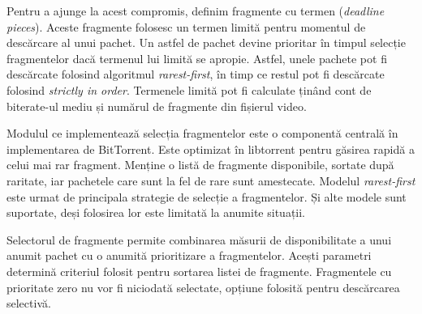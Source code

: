 Pentru a ajunge la acest compromis, definim fragmente cu termen
(\textit{deadline pieces}). Aceste fragmente folosesc un termen limită pentru
momentul de descărcare al unui pachet. Un astfel de pachet devine prioritar în
timpul selecție fragmentelor dacă termenul lui limită se apropie. Astfel,
unele pachete pot fi descărcate folosind algoritmul \textit{rarest-first},
în timp ce restul pot fi descărcate folosind \textit{strictly in order}.
Termenele limită pot fi calculate ținând cont de biterate-ul mediu și numărul
de fragmente din fișierul video.

Modulul ce implementează selecția fragmentelor este o componentă centrală în
implementarea de BitTorrent. Este optimizat în libtorrent pentru găsirea
rapidă a celui mai rar fragment. Menține o listă de fragmente disponibile,
sortate după raritate, iar pachetele care sunt la fel de rare sunt amestecate.
Modelul \textit{rarest-first} este urmat de principala strategie de selecție a
fragmentelor. Și alte modele sunt suportate, deși folosirea lor este limitată
la anumite situații.

Selectorul de fragmente permite combinarea măsurii de disponibilitate a unui
anumit pachet cu o anumită prioritizare a fragmentelor. Acești parametri
determină criteriul folosit pentru sortarea listei de fragmente. Fragmentele
cu prioritate zero nu vor fi niciodată selectate, opțiune folosită pentru
descărcarea selectivă.


